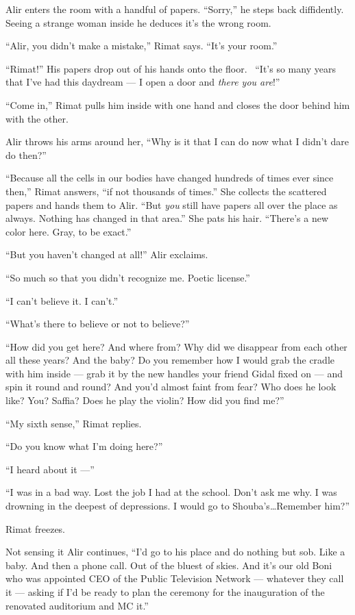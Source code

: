\documentclass[twoside,11pt]{book}
\begin{document}
Alir enters the room with a handful of papers. ``Sorry,'' he steps back diffidently. Seeing a
strange woman inside he deduces it's the wrong room.

``Alir, you didn't make a mistake,'' Rimat says. ``It's your room.''


``Rimat!'' His papers drop out of his hands onto the floor.~ ``It's so many years
that I've had this daydream --- I open a door and \textit{there you are}!''

``Come in,'' Rimat pulls him inside with one hand and closes the door behind him with the
other.

Alir throws his arms around her, ``Why is it that I can do now what I didn't dare do then?''

``Because all the cells in our bodies have changed hundreds of times ever since then,'' Rimat
answers, ``if not thousands of times.'' She collects the scattered papers and hands them to
Alir. ``But \textit{you} still have papers all over the place as always. Nothing has changed in that
area.'' She pats his hair. ``There's a new color here. Gray, to be exact.''

``But you haven't changed at all!'' Alir exclaims.

``So much so that you didn't recognize me. Poetic license.''

``I can't believe it. I can't.''

``What's there to believe or not to believe?''

``How did you get here? And where from? Why did we disappear from each other all these years? And the baby?
Do you remember how I would grab the cradle with him inside --- grab it by the new handles your friend Gidal
fixed on ---
and spin it round and round? And you'd almost faint from fear? Who does he look like? You? Saffia? Does he play the
violin? How did you find me?''

``My sixth sense,'' Rimat replies.

``Do you know what I'm doing here?''

``I heard about it ---''

``I was in a bad way. Lost the job I had at the school. Don't ask me why. I was drowning in the deepest of
depressions. I would go to Shouba's{\ldots}Remember him?''

Rimat freezes.

Not sensing it Alir continues, ``I'd go to his place and do nothing but sob. Like a baby. And then a phone
call. Out of the bluest of skies. And it's our old Boni who was appointed CEO of the Public Television Network ---
whatever they call it --- asking if I'd be ready to plan the ceremony for the inauguration of the renovated auditorium
and MC it.''
\end{document}
